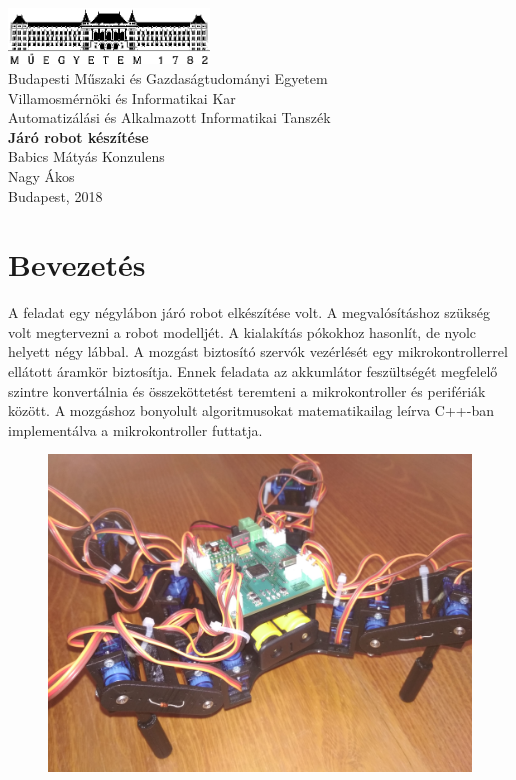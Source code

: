 \documentclass{article}
\begin{document}
\begin{titlepage}
	\begin{center}
		\vspace*{0.5cm}
		\includegraphics[width=0.4\textwidth]{bme}\\		
		Budapesti Műszaki és Gazdaságtudományi Egyetem\\
		Villamosmérnöki és Informatikai Kar\\
		Automatizálási és Alkalmazott Informatikai Tanszék\\		
		\vspace{3.2cm}
		\huge
		\textbf{Járó robot készítése}
		\vspace{1.5cm}\\
		\large
		Babics Mátyás	
		\vfill		
		Konzulens\\
		Nagy Ákos\\
		\vspace{1.5cm}		
		Budapest, 2018		
	\end{center}
\end{titlepage}
\section{Bevezetés}
A feladat egy négylábon járó robot elkészítése volt. A megvalósításhoz szükség volt megtervezni a robot modelljét. A kialakítás pókokhoz hasonlít, de nyolc helyett négy lábbal. A mozgást biztosító szervók vezérlését egy mikrokontrollerrel ellátott áramkör biztosítja. Ennek feladata az akkumlátor feszültségét megfelelő szintre konvertálnia és összeköttetést teremteni a mikrokontroller és perifériák között. A mozgáshoz bonyolult algoritmusokat matematikailag leírva C++-ban implementálva a mikrokontroller futtatja.
\begin{figure}[h]
	\includegraphics[width=\textwidth]{quad}
\end{figure}
\newpage
\end{document}
